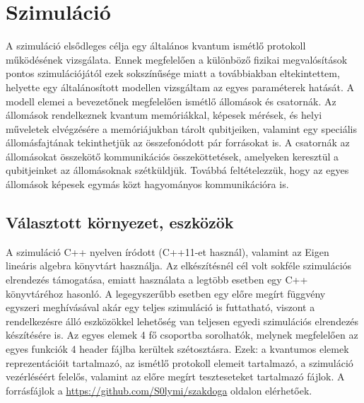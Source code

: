 \chapter{Szimuláció}

A szimuláció elsődleges célja egy általános kvantum ismétlő protokoll működésének vizsgálata. Ennek megfelelően a különböző fizikai megvalósítások pontos szimulációjától ezek sokszínűsége miatt a továbbiakban eltekintettem, helyette egy általánosított modellen vizsgáltam az egyes paraméterek hatását. A modell elemei a bevezetőnek megfelelően ismétlő állomások és csatornák. Az állomások rendelkeznek kvantum memóriákkal, képesek mérések, és helyi műveletek elvégzésére a memóriájukban tárolt qubitjeiken, valamint egy speciális állomásfajtának tekinthetjük az összefonódott pár forrásokat is. A csatornák az állomásokat összekötő kommunikációs összeköttetések, amelyeken keresztül a qubitjeinket az állomásoknak szétküldjük. Továbbá feltételezzük, hogy az egyes állomások képesek egymás közt hagyományos kommunikációra is. 

\section{Választott környezet, eszközök}

A szimuláció C++ nyelven íródott (C++11-et használ), valamint az Eigen \cite{eigen}  lineáris algebra könyvtárt használja. Az elkészítésnél cél volt sokféle szimulációs elrendezés támogatása, emiatt használata a legtöbb esetben egy C++ könyvtáréhoz hasonló. A legegyszerűbb esetben egy előre megírt függvény egyszeri meghívásával akár egy teljes szimuláció is futtatható, viszont a rendelkezésre álló eszközökkel lehetőség van teljesen egyedi szimulációs elrendezés készítésére is. Az egyes elemek 4 fő csoportba sorolhatók, melynek megfelelően az egyes funkciók 4 header fájlba kerültek szétosztásra. Ezek: a kvantumos elemek reprezentációit tartalmazó, az ismétlő protokoll elemeit tartalmazó, a szimuláció vezérléséért felelős, valamint az előre megírt teszteseteket  tartalmazó fájlok. A forrásfájlok a \url{https://github.com/S0lymi/szakdoga} oldalon elérhetőek.


